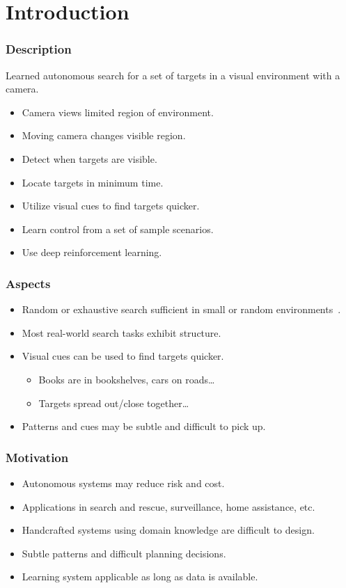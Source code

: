 
\section{Introduction}

\begin{frame}
    \frametitle{Description}
    
    Learned autonomous search for a set of targets in a visual environment with a camera.

    \begin{itemize}
        \item Camera views limited region of environment.
        \item Moving camera changes visible region.
        \item Detect when targets are visible.
        \item Locate targets in minimum time.
        \item Utilize visual cues to find targets quicker.
        \item Learn control from a set of sample scenarios.
        \item Use deep reinforcement learning.
    \end{itemize}
\end{frame}

\begin{frame}
    \frametitle{Aspects}

    \begin{itemize}
        \item Random or exhaustive search sufficient in small or random environments~\cite{nakayama_situating_2011}.
        \item Most real-world search tasks exhibit structure.
        \item Visual cues can be used to find targets quicker.
        \begin{itemize}
            \item Books are in bookshelves, cars on roads\dots
            \item Targets spread out/close together\dots
        \end{itemize}
        \item Patterns and cues may be subtle and difficult to pick up.
    \end{itemize}
\end{frame}

\begin{frame}
    \frametitle{Motivation}
    
    \begin{itemize}
        \item Autonomous systems may reduce risk and cost.
        \item Applications in search and rescue, surveillance, home assistance, etc.
        \item Handcrafted systems using domain knowledge are difficult to design.
        \item Subtle patterns and difficult planning decisions.
        \item Learning system applicable as long as data is available.
    \end{itemize}
\end{frame}

